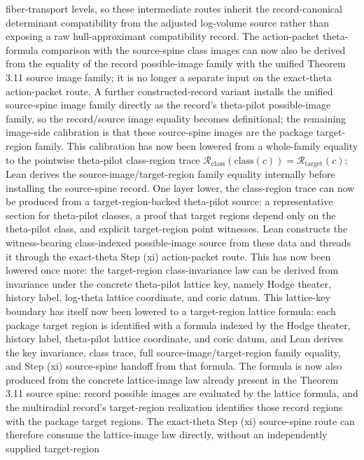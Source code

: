 \documentclass[11pt]{article}
\theoremstyle{plain}
\theoremstyle{definition}
\theoremstyle{remark}
\begin{document}
fiber-transport levels, so these intermediate routes inherit the
record-canonical determinant compatibility from the adjusted log-volume source
rather than exposing a raw hull-approximant compatibility record.  The
action-packet theta-formula comparison with the source-spine class images can
now also be derived from the equality of the record possible-image family with
the unified Theorem 3.11 source image family; it is no longer a separate input
on the exact-theta action-packet route.  A further constructed-record variant
installs the unified source-spine image family directly as the record's
theta-pilot possible-image family, so the record/source image equality becomes
definitional; the remaining image-side calibration is that these source-spine
images are the package target-region family.  This calibration has now been
lowered from a whole-family equality to the pointwise theta-pilot
class-region trace
\(\mathcal R_{\mathrm{class}}(\mathrm{class}(c))
  =\mathcal R_{\mathrm{target}}(c)\);
Lean derives the source-image/target-region family equality internally before
installing the source-spine record.  One layer lower, the class-region trace
can now be produced from a target-region-backed theta-pilot source: a
representative section for theta-pilot classes, a proof that target regions
depend only on the theta-pilot class, and explicit target-region point
witnesses.  Lean constructs the witness-bearing class-indexed possible-image
source from these data and threads it through the exact-theta Step (xi)
action-packet route.  This has now been lowered once more: the target-region
class-invariance law can be derived from invariance under the concrete
theta-pilot lattice key, namely Hodge theater, history label, log-theta
lattice coordinate, and coric datum.  This lattice-key boundary has itself
now been lowered to a target-region lattice formula: each package target
region is identified with a formula indexed by the Hodge theater, history
label, theta-pilot lattice coordinate, and coric datum, and Lean derives the
key invariance, class trace, full source-image/target-region family
equality, and Step (xi) source-spine handoff from that formula.  The formula
is now also produced from the concrete lattice-image law already present in
the Theorem 3.11 source spine: record possible images are evaluated by the
lattice formula, and the multiradial record's target-region realization
identifies those record regions with the package target regions.  The
exact-theta Step (xi) source-spine route can therefore consume the
lattice-image law directly, without an independently supplied target-region
\end{document}
